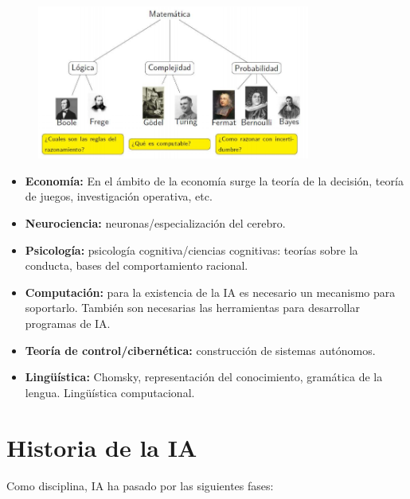 \documentclass{article}
\begin{document}
\begin{figure}
\centering
\includegraphics[scale=1,width=0.8\textwidth]{bases_ia.png}
\end{figure}

\begin{itemize}
\item \textbf{Economía:} En el ámbito de la economía surge la teoría de la decisión, teoría de juegos, investigación operativa, etc.

\item \textbf{Neurociencia:} neuronas/especialización del cerebro.

\item \textbf{Psicología:} psicología cognitiva/ciencias cognitivas: teorías sobre la conducta, bases del comportamiento racional.

\item \textbf{Computación:} para la existencia de la IA es necesario un mecanismo para soportarlo. También son necesarias las herramientas para desarrollar programas de IA.

\item \textbf{Teoría de control/cibernética:} construcción de sistemas autónomos.

\item \textbf{Lingüística:} Chomsky, representación del conocimiento, gramática de la lengua. Lingüística computacional.
\end{itemize}

\section{Historia de la IA}
Como disciplina, IA ha pasado por las siguientes fases:
\end{document}
